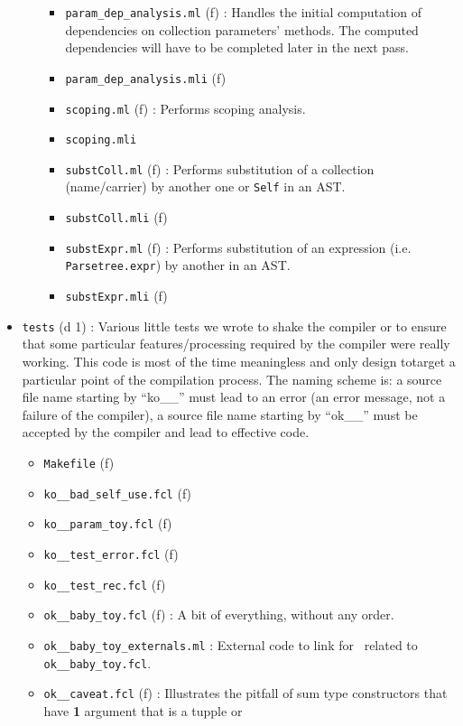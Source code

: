 \begin{itemize}
\begin{itemize}
\begin{itemize}
    \item {\tt param\_dep\_analysis.ml} (f) : Handles the initial
      computation of dependencies on collection parameters'
      methods. The computed dependencies will have to be completed
      later in the next pass.
    \item {\tt param\_dep\_analysis.mli} (f)
    \item {\tt scoping.ml} (f) : Performs scoping analysis.
    \item {\tt scoping.mli}
    \item {\tt substColl.ml} (f) : Performs substitution of a
      collection (name/carrier) by another one or {\tt Self} in an
      AST.
    \item {\tt substColl.mli} (f)
    \item {\tt substExpr.ml} (f) : Performs substitution of an
    expression (i.e. {\tt Parsetree.expr}) by another in an AST.
    \item {\tt substExpr.mli} (f)
    \end{itemize}
  \end{itemize}
\item {\tt tests} (d 1) : Various little tests we wrote to shake the
  compiler or to ensure that some particular features/processing
  required by the compiler were really working. This code is most of
  the time meaningless and only design totarget a particular point of
  the compilation process. The naming scheme is: a source file name
  starting by ``ko\_\_'' must lead to an error (an error message, not
  a failure of the compiler), a source file name starting by
  ``ok\_\_'' must be accepted by the compiler and lead to effective
  code.
  \begin{itemize}
  \item {\tt Makefile} (f)
  \item {\tt ko\_\_bad\_self\_use.fcl} (f)
  \item {\tt ko\_\_param\_toy.fcl} (f)
  \item {\tt ko\_\_test\_error.fcl} (f)
  \item {\tt ko\_\_test\_rec.fcl} (f)
  \item {\tt ok\_\_baby\_toy.fcl} (f) : A bit of everything, without
    any order.
  \item {\tt ok\_\_baby\_toy\_externals.ml} : External code to link
    for \ocaml\ related to {\tt ok\_\_baby\_toy.fcl}.
  \item {\tt ok\_\_caveat.fcl} (f) : Illustrates the pitfall of sum
    type constructors that have {\bf 1} argument that is a tupple or

\end{itemize}
\end{itemize}
